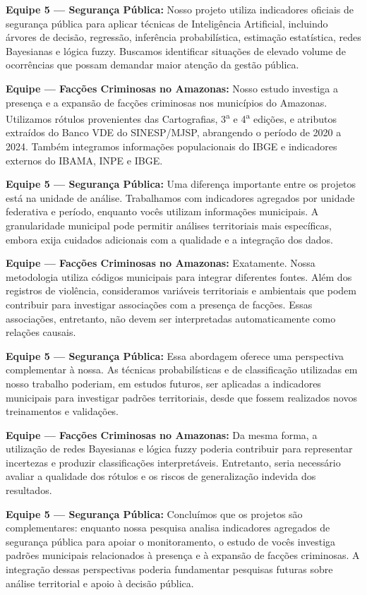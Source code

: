 \documentclass[12pt,a4paper]{article}
\begin{document}
\begin{list}{}{\setlength{\leftmargin}{.4cm}\setlength{\rightmargin}{0cm}\setlength{\topsep}{2pt}\setlength{\itemsep}{2pt}\setlength{\parsep}{0pt}}\footnotesize
\item[] \textbf{Equipe 5 --- Segurança Pública:} Nosso projeto utiliza indicadores oficiais de segurança pública para aplicar técnicas de Inteligência Artificial, incluindo árvores de decisão, regressão, inferência probabilística, estimação estatística, redes Bayesianas e lógica fuzzy. Buscamos identificar situações de elevado volume de ocorrências que possam demandar maior atenção da gestão pública.
\item[] \textbf{Equipe --- Facções Criminosas no Amazonas:} Nosso estudo investiga a presença e a expansão de facções criminosas nos municípios do Amazonas. Utilizamos rótulos provenientes das Cartografias, 3\textsuperscript{a} e 4\textsuperscript{a} edições, e atributos extraídos do Banco VDE do SINESP/MJSP, abrangendo o período de 2020 a 2024. Também integramos informações populacionais do IBGE e indicadores externos do IBAMA, INPE e IBGE.
\item[] \textbf{Equipe 5 --- Segurança Pública:} Uma diferença importante entre os projetos está na unidade de análise. Trabalhamos com indicadores agregados por unidade federativa e período, enquanto vocês utilizam informações municipais. A granularidade municipal pode permitir análises territoriais mais específicas, embora exija cuidados adicionais com a qualidade e a integração dos dados.
\item[] \textbf{Equipe --- Facções Criminosas no Amazonas:} Exatamente. Nossa metodologia utiliza códigos municipais para integrar diferentes fontes. Além dos registros de violência, consideramos variáveis territoriais e ambientais que podem contribuir para investigar associações com a presença de facções. Essas associações, entretanto, não devem ser interpretadas automaticamente como relações causais.
\item[] \textbf{Equipe 5 --- Segurança Pública:} Essa abordagem oferece uma perspectiva complementar à nossa. As técnicas probabilísticas e de classificação utilizadas em nosso trabalho poderiam, em estudos futuros, ser aplicadas a indicadores municipais para investigar padrões territoriais, desde que fossem realizados novos treinamentos e validações.
\item[] \textbf{Equipe --- Facções Criminosas no Amazonas:} Da mesma forma, a utilização de redes Bayesianas e lógica fuzzy poderia contribuir para representar incertezas e produzir classificações interpretáveis. Entretanto, seria necessário avaliar a qualidade dos rótulos e os riscos de generalização indevida dos resultados.
\item[] \textbf{Equipe 5 --- Segurança Pública:} Concluímos que os projetos são complementares: enquanto nossa pesquisa analisa indicadores agregados de segurança pública para apoiar o monitoramento, o estudo de vocês investiga padrões municipais relacionados à presença e à expansão de facções criminosas. A integração dessas perspectivas poderia fundamentar pesquisas futuras sobre análise territorial e apoio à decisão pública.
\end{list}
\end{document}
